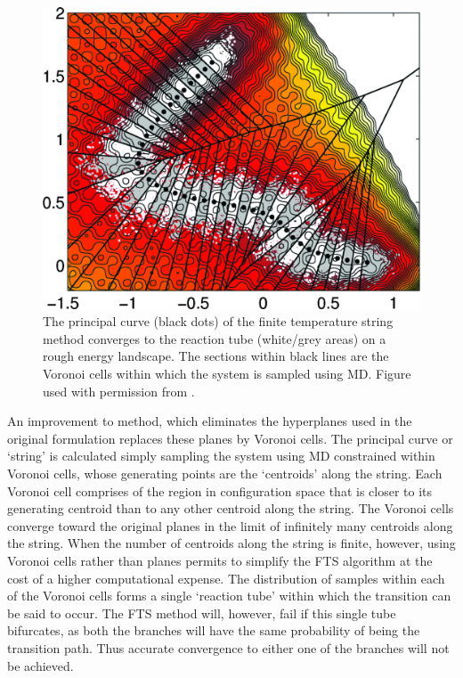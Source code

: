 \documentclass{article}
\begin{document}
\begin{figure}[htp]
\centering
\includegraphics[scale=1.2]{MEP_fts}
\caption{The principal curve (black dots) of the finite temperature string method converges to the reaction tube (white/grey areas) on a rough energy landscape. The sections within black lines are the Voronoi cells within which the system is sampled using MD. Figure used with permission from \cite{Vanden-Eijnden2009}.}
 \label{fig:4}
\end{figure}

An improvement to method, which eliminates the hyperplanes used in the original formulation replaces these planes by Voronoi cells. The principal curve or \enquote*{string} is calculated simply sampling the system using MD constrained within Voronoi cells, whose generating points are the \enquote*{centroids} along the string. Each Voronoi cell comprises of the region in configuration space that is closer to its generating centroid than to any other centroid along the string. The Voronoi cells converge toward the original planes in the limit of infinitely many centroids along the string. When the number of centroids along the string is finite, however, using Voronoi cells rather than planes permits to simplify the FTS algorithm at the cost of a higher computational expense. The distribution of samples within each of the Voronoi cells forms a single \enquote*{reaction tube} within which the transition can be said to occur. The FTS method will, however, fail if this single tube bifurcates, as both the branches will have the same probability of being the transition path. Thus accurate convergence to either one of the branches will not be achieved.
\end{document}
